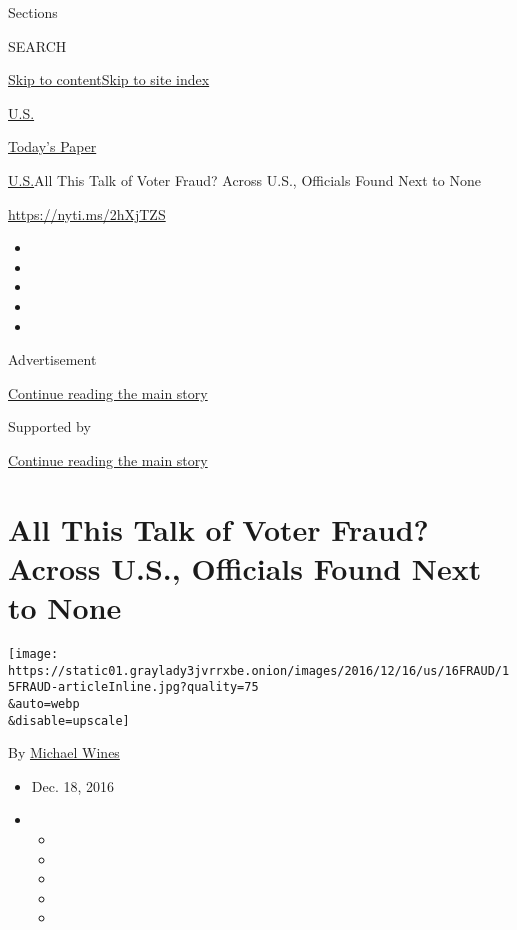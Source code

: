Sections

SEARCH

\protect\hyperlink{site-content}{Skip to
content}\protect\hyperlink{site-index}{Skip to site index}

\href{https://www.nytimes3xbfgragh.onion/section/us}{U.S.}

\href{https://myaccount.nytimes3xbfgragh.onion/auth/login?response_type=cookie\&client_id=vi}{}

\href{https://www.nytimes3xbfgragh.onion/section/todayspaper}{Today's
Paper}

\href{/section/us}{U.S.}\textbar{}All This Talk of Voter Fraud? Across
U.S., Officials Found Next to None

\url{https://nyti.ms/2hXjTZS}

\begin{itemize}
\item
\item
\item
\item
\item
\end{itemize}

Advertisement

\protect\hyperlink{after-top}{Continue reading the main story}

Supported by

\protect\hyperlink{after-sponsor}{Continue reading the main story}

\hypertarget{all-this-talk-of-voter-fraud-across-us-officials-found-next-to-none}{%
\section{All This Talk of Voter Fraud? Across U.S., Officials Found Next
to
None}\label{all-this-talk-of-voter-fraud-across-us-officials-found-next-to-none}}

\texttt{[image: https://static01.graylady3jvrrxbe.onion/images/2016/12/16/us/16FRAUD/15FRAUD-articleInline.jpg?quality=75\\\&auto=webp\\\&disable=upscale]}

By \href{https://www.nytimes3xbfgragh.onion/by/michael-wines}{Michael
Wines}

\begin{itemize}
\item
  Dec. 18, 2016
\item
  \begin{itemize}
  \item
  \item
  \item
  \item
  \item
  \end{itemize}
\end{itemize}

